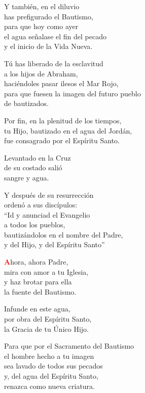 \documentclass[12pt, letterpaper, spanish]{article}
\begin{document}
  \noindent
  Y tambi\'en, en el diluvio\\ 
  has prefigurado el Bautismo,\\ 
  para que hoy como ayer\\ 
  el agua se\~nalase el fin del pecado\\ 
  y el inicio de la Vida Nueva.

  \noindent
  T\'u has liberado de la esclavitud\\ 
  a los hijos de Abraham,\\ 
  haci\'endoles pasar ilesos el Mar Rojo,\\ 
  para que fuesen la imagen del futuro pueblo\\ 
  de bautizados.

  \noindent
  Por fin, en la plenitud de los tiempos,\\ 
  tu Hijo, bautizado en el agua del Jord\'an, \\ 
  fue consagrado por el Esp\'iritu Santo.

  \noindent
  Levantado en la Cruz\\ 
  de su costado sali\'o\\ 
  sangre y agua.

  \noindent
  Y despu\'es de su resurrecci\'on\\ 
  orden\'o a sus disc\'ipulos:\\ 
  ``Id y anunciad el Evangelio\\ 
  a todos los pueblos,\\ 
  bautiz\'andolos en el nombre del Padre,\\ 
  y del Hijo, y del Esp\'iritu Santo''

  \lettrine[lines=2]{\bfseries \textcolor{red}{A}}{}\Large{hora, ahora Padre,\\ 
  mira con amor a tu Iglesia,\\ 
  y haz brotar para ella\\ 
  la fuente del Bautismo.}
  
  \clearpage

  \noindent
  Infunde en este agua,\\ 
  por obra del Esp\'iritu Santo,\\ 
  la Gracia de tu \'Unico Hijo.

  \noindent
  Para que por el Sacramento del Bautismo\\ 
  el hombre hecho a tu imagen\\ 
  sea lavado de todos sus pecados\\ 
  y, del agua del Esp\'iritu Santo,\\ 
  renazca como nueva criatura.
\end{document}
